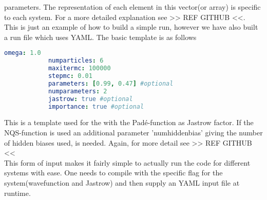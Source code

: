     parameters. The representation of each element in this vector(or
    array) is specific to each system. For a more detailed explanation see >>
    REF GITHUB <<. \\
    This is just an example of how to build a simple run, however we have also
    built a run file which uses YAML\cite{yaml}. The basic template is as
    follows
        \begin{lstlisting}[language=yaml]
            omega: 1.0
            numparticles: 6
            maxitermc: 100000
            stepmc: 0.01
            parameters: [0.99, 0.47] #optional
            numparameters: 2
            jastrow: true #optional
            importance: true #optional
        \end{lstlisting}
    This is a template used for the  with the
    Pad\'e-function as Jastrow factor. If the NQS-function is used an
    additional parameter 'numhiddenbias' giving the number of hidden biases
    used, is needed. Again, for more detail see >> REF GITHUB << \\ 
    This form of input makes it fairly simple to actually run the code for
    different systems with ease. One needs to compile with the specific flag
    for the system(wavefunction and Jastrow) and then supply an YAML input file
    at runtime.

